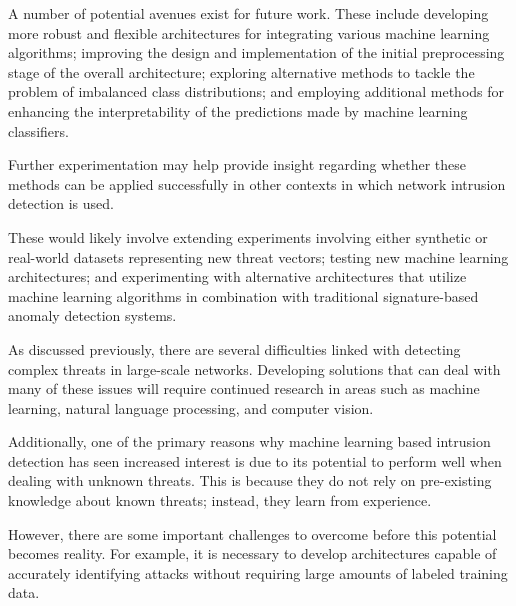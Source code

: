 A number of potential avenues exist for future work. These include developing more robust and flexible architectures for integrating various machine learning algorithms; improving the design and implementation of the initial preprocessing stage of the overall architecture; exploring alternative methods to tackle the problem of imbalanced class distributions; and employing additional methods for enhancing the interpretability of the predictions made by machine learning classifiers.

Further experimentation may help provide insight regarding whether these methods can be applied successfully in other contexts in which network intrusion detection is used.

These would likely involve extending experiments involving either synthetic or real-world datasets representing new threat vectors; testing new machine learning architectures; and experimenting with alternative architectures that utilize machine learning algorithms in combination with traditional signature-based anomaly detection systems.

As discussed previously, there are several difficulties linked with detecting complex threats in large-scale networks. Developing solutions that can deal with many of these issues will require continued research in areas such as machine learning, natural language processing, and computer vision.

Additionally, one of the primary reasons why machine learning based intrusion detection has seen increased interest is due to its potential to perform well when dealing with unknown threats. This is because they do not rely on pre-existing knowledge about known threats; instead, they learn from experience.

However, there are some important challenges to overcome before this potential becomes reality. For example, it is necessary to develop architectures capable of accurately identifying attacks without requiring large amounts of labeled training data.

